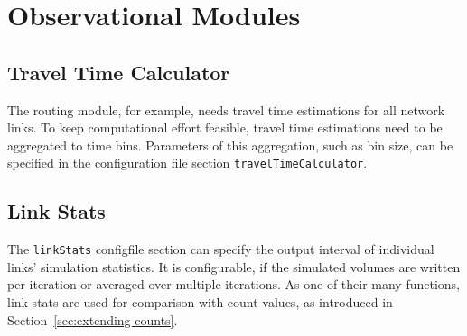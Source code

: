 \section{Observational Modules}
\label{sec:observational}

\subsection{Travel Time Calculator}
\label{sec:ttc}
The routing module, for example, needs travel time estimations for all network links. To keep  computational effort feasible, travel time estimations need to be aggregated to time bins. Parameters of this aggregation, such as bin size, can be specified in the configuration file section \lstinline|travelTimeCalculator|.

\subsection{Link Stats}
\label{sec:linkStats}
The \lstinline|linkStats| \gls{configfile} section can specify the output interval of individual links' simulation statistics. It is configurable, if the simulated volumes are written per iteration or averaged over multiple iterations. As one of their many functions, link stats are used for comparison with count values, as introduced in Section~\ref{sec:extending-counts}. 



